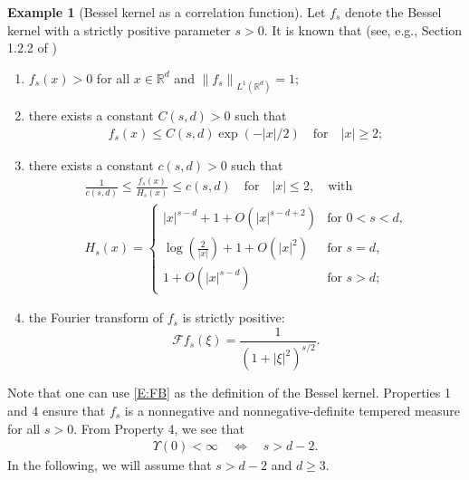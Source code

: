 \documentclass[12pt]{report}
\theoremstyle{plain}
\theoremstyle{definition}
\newtheorem{example}[theorem]{Example}
\numberwithin{equation}{section}
\newcommand{\R}{\mathbb{R}}
\newcommand{\Norm}[1]{\left\|  #1   \right\|}
\begin{document}
\begin{example}[Bessel kernel as a correlation function] \label{Ex:Gamma+f}
	Let $f_s$ denote the Bessel kernel with a strictly positive parameter $s>0$. It is known that
	(see, e.g., Section 1.2.2 of \cite{grafakos:14:modern})
	\begin{enumerate}
		\item $f_s(x)>0$ for all $x\in\R^d$ and $ \Norm{f_s}_{L^1(\R^d)}=1$;
		\item there exists a constant $C(s,d)>0$ such that
		\begin{align*}
		f_s(x) \le C(s,d) \exp(-|x|/2) \quad \text{for} \quad |x| \ge 2;
		\end{align*}
		\item there exists a constant $c(s,d)>0$ such that
		\begin{gather*}
		\frac{1}{c(s,d)} \le \frac{f_s(x)}{H_s(x)} \le c(s,d) \quad \text{for} \quad |x| \le 2, \quad \text{with} \\
		H_s(x) =
		\begin{cases}
		|x|^{s-d} + 1 + O(|x|^{s-d+2})                  & \text{for $0<s<d$,} \\
		\log\left(\frac{2}{|x|}\right) + 1 + O(|x|^{2}) & \text{for $s=d$,}   \\
		1 + O(|x|^{s-d})                               & \text{for $s>d$;}
		\end{cases}
		\end{gather*}
		\item the Fourier transform of $f_s$ is strictly positive:
		\begin{equation} \label{E:FB}
		\mathcal{F}f_s(\xi) = \frac{1}{(1+|\xi|^2)^{s/2}}.
		\end{equation}
	\end{enumerate}
	Note that one can use \eqref{E:FB} as the definition of the Bessel kernel. Properties 1 and 4 ensure
	that $f_s$ is a nonnegative and nonnegative-definite tempered measure for all $s>0$. From Property
	4, we see that
	\begin{align*}
	\Upsilon(0)<\infty \quad \Longleftrightarrow \quad  s>d-2.
	\end{align*}
	In the following, we will assume that $s>d-2$ and $d\ge 3$.
\end{example}
\end{document}
